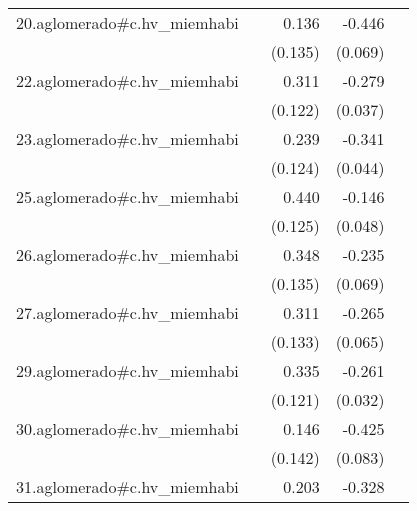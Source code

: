 {\begin{longtable}{l*{4}{D{.}{.}{-1}}}
\addlinespace
20.aglomerado#c.hv\_miemhabi&                     &       0.136         &      -0.446\sym{***}&                     \\
            &                     &     (0.135)         &     (0.069)         &                     \\
\addlinespace
22.aglomerado#c.hv\_miemhabi&                     &       0.311\sym{*}  &      -0.279\sym{***}&                     \\
            &                     &     (0.122)         &     (0.037)         &                     \\
\addlinespace
23.aglomerado#c.hv\_miemhabi&                     &       0.239         &      -0.341\sym{***}&                     \\
            &                     &     (0.124)         &     (0.044)         &                     \\
\addlinespace
25.aglomerado#c.hv\_miemhabi&                     &       0.440\sym{***}&      -0.146\sym{**} &                     \\
            &                     &     (0.125)         &     (0.048)         &                     \\
\addlinespace
26.aglomerado#c.hv\_miemhabi&                     &       0.348\sym{**} &      -0.235\sym{***}&                     \\
            &                     &     (0.135)         &     (0.069)         &                     \\
\addlinespace
27.aglomerado#c.hv\_miemhabi&                     &       0.311\sym{*}  &      -0.265\sym{***}&                     \\
            &                     &     (0.133)         &     (0.065)         &                     \\
\addlinespace
29.aglomerado#c.hv\_miemhabi&                     &       0.335\sym{**} &      -0.261\sym{***}&                     \\
            &                     &     (0.121)         &     (0.032)         &                     \\
\addlinespace
30.aglomerado#c.hv\_miemhabi&                     &       0.146         &      -0.425\sym{***}&                     \\
            &                     &     (0.142)         &     (0.083)         &                     \\
\addlinespace
31.aglomerado#c.hv\_miemhabi&                     &       0.203         &      -0.328\sym{***}&                     \\

\end{longtable}}
